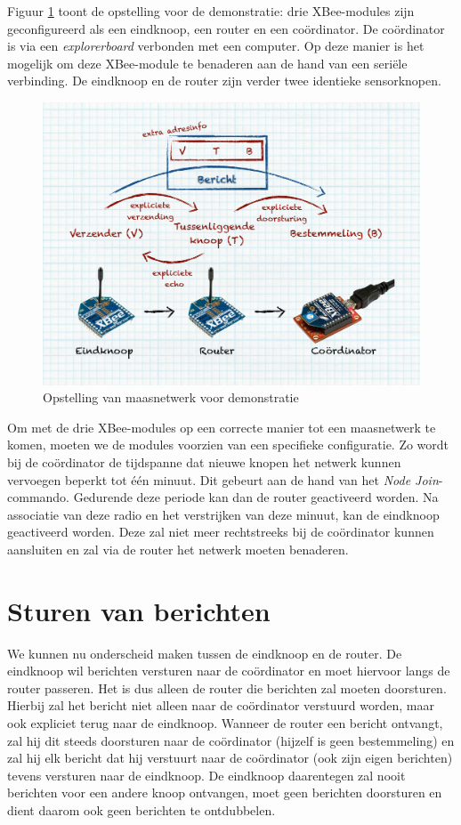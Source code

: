 Figuur \ref{fig:xbee-setup} toont de opstelling voor de demonstratie: drie
XBee-modules zijn geconfigureerd als een eindknoop, een router en een
co\"ordinator. De co\"ordinator is via een \emph{explorerboard} verbonden met
een computer. Op deze manier is het mogelijk om deze XBee-module te benaderen
aan de hand van een seri\"ele verbinding. De eindknoop en de router zijn verder
twee identieke sensorknopen.

\begin{figure}[ht]
  \centering
  \includegraphics[width=0.9\linewidth]{resources/xbee-setup.pdf}
  \caption{Opstelling van maasnetwerk voor demonstratie}
  \label{fig:xbee-setup}
\end{figure}

Om met de drie XBee-modules op een correcte manier tot een maasnetwerk te
komen, moeten we de modules voorzien van een specifieke configuratie. Zo wordt
bij de co\"ordinator de tijdspanne dat nieuwe knopen het netwerk kunnen
vervoegen beperkt tot \'e\'en minuut. Dit gebeurt aan de hand van het
\emph{Node Join}-commando. Gedurende deze periode kan dan de router geactiveerd
worden. Na associatie van deze radio en het verstrijken van deze minuut, kan de
eindknoop geactiveerd worden. Deze zal niet meer rechtstreeks bij de
co\"ordinator kunnen aansluiten en zal via de router het netwerk moeten
benaderen.

\section{Sturen van berichten}

We kunnen nu onderscheid maken tussen de eindknoop en de router. De eindknoop
wil berichten versturen naar de co\"ordinator en moet hiervoor langs de router
passeren. Het is dus alleen de router die berichten zal moeten doorsturen.
Hierbij zal het bericht niet alleen naar de co\"ordinator verstuurd worden,
maar ook expliciet terug naar de eindknoop. Wanneer de router een bericht
ontvangt, zal hij dit steeds doorsturen naar de co\"ordinator (hijzelf is geen
bestemmeling) en zal hij elk bericht dat hij verstuurt naar de co\"ordinator
(ook zijn eigen berichten) tevens versturen naar de eindknoop. De eindknoop
daarentegen zal nooit berichten voor een andere knoop ontvangen, moet geen
berichten doorsturen en dient daarom ook geen berichten te ontdubbelen.

